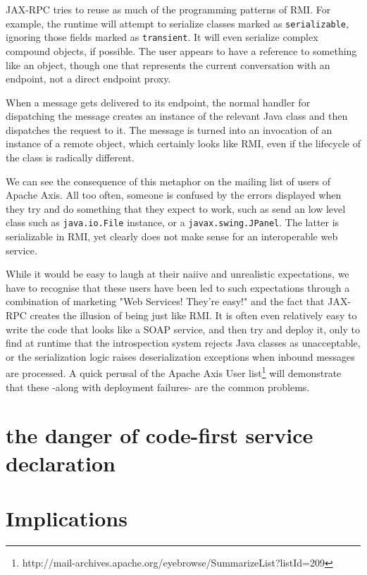 \documentclass[draft]{article}
\begin{document}
JAX-RPC tries to reuse as much of the programming patterns of RMI. For example,
the runtime will attempt to serialize classes marked as \verb|serializable|,
ignoring those fields marked as \verb|transient|. It will even serialize complex
compound objects, if possible. The user appears to have a reference to something
like an object, though one that represents the current conversation with an endpoint,
not a direct endpoint proxy. 

When a message gets delivered to its endpoint, the normal handler for
dispatching the message creates an instance of the relevant Java class and then
dispatches the request to it. The message is turned into an invocation of an
instance of a remote object, which certainly looks like RMI, even if the
lifecycle of the class is radically different. 


We can see the consequence of this metaphor on the mailing list of users of
Apache Axis. All too often, someone is confused by the errors displayed when
they try and do something that they expect to work, such as send an low level
class such as \verb|java.io.File| instance, or a \verb|javax.swing.JPanel|. The
latter is serializable in RMI, yet clearly does not make sense for an
interoperable web service. 

While it would be easy to laugh at their naiive and unrealistic
expectations, we have to recognise that these users have been led to
such expectations through a combination of marketing "Web Services!
They're easy!" and the fact that JAX-RPC creates the illusion of being
just like RMI. It is often even relatively easy to write the code that
looks like a SOAP service, and then try and deploy it, only to find at
runtime that the introspection system rejects Java classes as
unacceptable, or the serialization logic raises deserialization
exceptions when inbound messages are processed. A quick perusal of the
Apache Axis User
list\footnote{http://mail-archives.apache.org/eyebrowse/SummarizeList?listId=209}
will demonstrate that these -along with deployment failures- are the
common problems.




\section{the danger of code-first service declaration}



\section{Implications}
\end{document}
